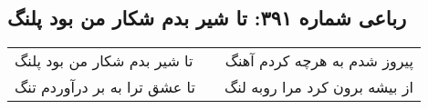 \begin{center}
\section*{رباعی شماره ۳۹۱: تا شیر بدم شکار من بود پلنگ}
\label{sec:sh391}
\begin{longtable}{l p{0.5cm} r}
تا شیر بدم شکار من بود پلنگ
&&
پیروز شدم به هرچه کردم آهنگ
\\
تا عشق ترا به بر درآوردم تنگ
&&
از بیشه برون کرد مرا روبه لنگ
\\
\end{longtable}
\end{center}
